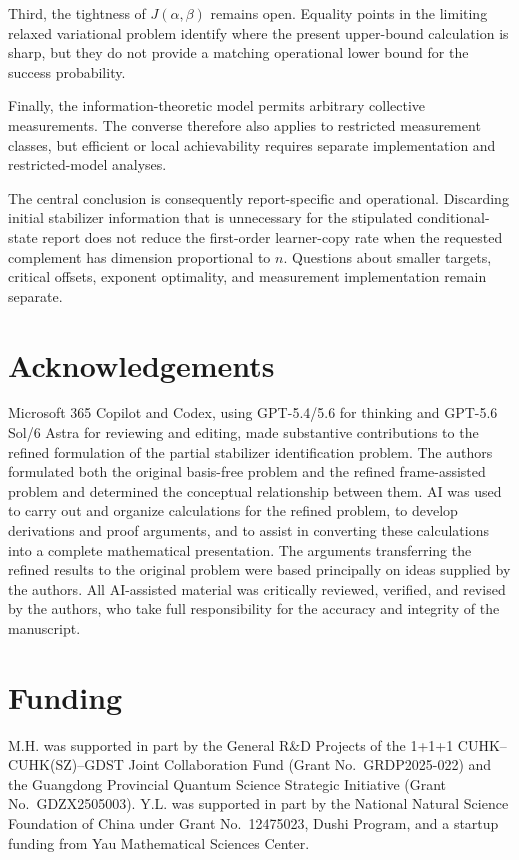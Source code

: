 \documentclass[11pt]{article}
\newcommand{\1}{\mathbf 1}
\theoremstyle{plain}
\theoremstyle{definition}
\theoremstyle{remark}
\begin{document}
Third, the tightness of $J(\alpha,\beta)$ remains open.  Equality points in the  
limiting relaxed variational problem identify where the present upper-bound  
calculation is sharp, but they do not provide a matching operational lower  
bound for the success probability.  

Finally, the information-theoretic model permits arbitrary collective  
measurements.  The converse therefore also applies to restricted measurement  
classes, but efficient or local achievability requires separate implementation  
and restricted-model analyses.  

The central conclusion is consequently report-specific and operational.  
Discarding initial stabilizer information that is unnecessary for the  
stipulated conditional-state report does not reduce the first-order learner-copy  
rate when the requested complement has dimension proportional to $n$.  
Questions about smaller targets, critical offsets, exponent optimality, and  
measurement implementation remain separate.  
\section*{Acknowledgements}
Microsoft 365 Copilot and Codex, using GPT-5.4/5.6 for thinking and GPT-5.6 Sol/6 Astra for reviewing and editing, made substantive contributions to the refined formulation of the partial stabilizer identification problem. The authors formulated both the original basis-free problem and the refined frame-assisted problem and determined the conceptual relationship between them. AI was used to carry out and organize calculations for the refined problem, to develop derivations and proof arguments, and to assist in converting these calculations into a complete mathematical presentation. The arguments transferring the refined results to the original problem were based principally on ideas supplied by the authors. 
All AI-assisted material was critically reviewed, verified, and revised by the authors, who take full responsibility for the accuracy and integrity of the manuscript.


\section*{Funding}
M.H. was supported in part by the General R\&D Projects of the 1+1+1
CUHK--CUHK(SZ)--GDST Joint Collaboration Fund (Grant No.~GRDP2025-022) and
the Guangdong Provincial Quantum Science Strategic Initiative
(Grant No.~GDZX2505003).
Y.L. was supported in part by the National Natural Science Foundation of China under Grant No.~12475023, Dushi Program, 
and a startup funding from Yau Mathematical Sciences Center.
\end{document}
